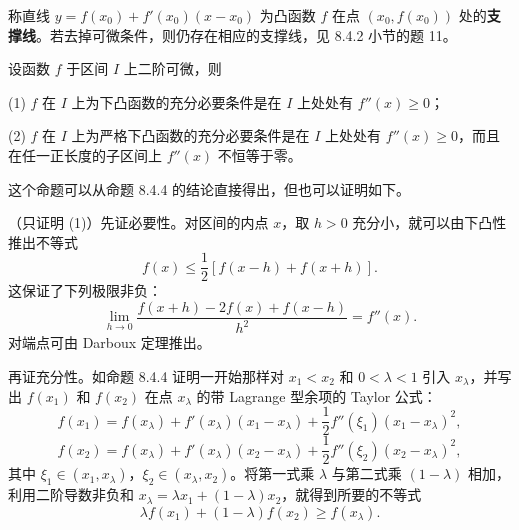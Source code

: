 \begin{xremark}
称直线 $y=f(x_0)+f'(x_0)(x-x_0)$ 为凸函数 $f$ 在点 $(x_0,f(x_0))$ 处的\textbf{支撑线}。若去掉可微条件，则仍存在相应的支撑线，见 8.4.2 小节的题 11。
\end{xremark}

\begin{xtheorem}[8.4.6]
设函数 $f$ 于区间 $I$ 上二阶可微，则

(1) $f$ 在 $I$ 上为下凸函数的充分必要条件是在 $I$ 上处处有 $f''(x)\ge0$；

(2) $f$ 在 $I$ 上为严格下凸函数的充分必要条件是在 $I$ 上处处有 $f''(x)\ge0$，而且在任一正长度的子区间上 $f''(x)$ 不恒等于零。
\end{xtheorem}

这个命题可以从命题 8.4.4 的结论直接得出，但也可以证明如下。

\begin{xproof}
（只证明 (1)）先证必要性。对区间的内点 $x$，取 $h>0$ 充分小，就可以由下凸性推出不等式
\[
  f(x)\le\frac12[f(x-h)+f(x+h)].
\]
这保证了下列极限非负：
\[
  \lim_{h\to0}\frac{f(x+h)-2f(x)+f(x-h)}{h^2}=f''(x).
\]
对端点可由 Darboux 定理推出。

再证充分性。如命题 8.4.4 证明一开始那样对 $x_1<x_2$ 和 $0<\lambda<1$ 引入 $x_\lambda$，并写出 $f(x_1)$ 和 $f(x_2)$ 在点 $x_\lambda$ 的带 Lagrange 型余项的 Taylor 公式：
\[
  f(x_1)=f(x_\lambda)+f'(x_\lambda)(x_1-x_\lambda)+\frac12f''(\xi_1)(x_1-x_\lambda)^2,
\]
\[
  f(x_2)=f(x_\lambda)+f'(x_\lambda)(x_2-x_\lambda)+\frac12f''(\xi_2)(x_2-x_\lambda)^2,
\]
其中 $\xi_1\in(x_1,x_\lambda)$，$\xi_2\in(x_\lambda,x_2)$。将第一式乘 $\lambda$ 与第二式乘 $(1-\lambda)$ 相加，利用二阶导数非负和 $x_\lambda=\lambda x_1+(1-\lambda)x_2$，就得到所要的不等式
\[
  \lambda f(x_1)+(1-\lambda)f(x_2)\ge f(x_\lambda).
\]
\end{xproof}

